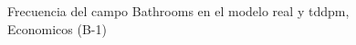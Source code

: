 \begin{figure}[H]
    \centering
    
    \caption{Frecuencia del campo Bathrooms en el modelo real y tddpm, Economicos (B-1)}
    \label{frecuency-Bathrooms-tddpm_mlp}
\end{figure}